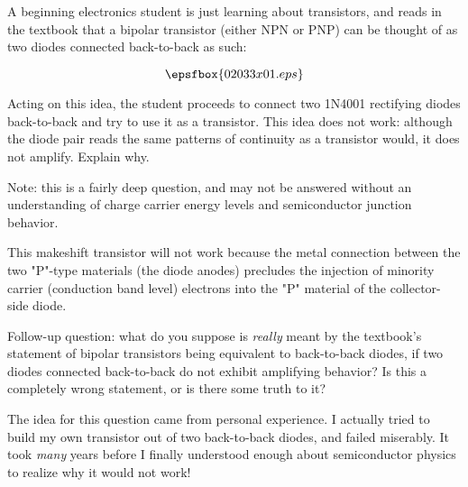 

A beginning electronics student is just learning about transistors, and reads in the textbook that a bipolar transistor (either NPN or PNP) can be thought of as two diodes connected back-to-back as such:

$$\epsfbox{02033x01.eps}$$

Acting on this idea, the student proceeds to connect two 1N4001 rectifying diodes back-to-back and try to use it as a transistor.  This idea does not work: although the diode pair reads the same patterns of continuity as a transistor would, it does not amplify.  Explain why.

Note: this is a fairly deep question, and may not be answered without an understanding of charge carrier energy levels and semiconductor junction behavior.







This makeshift transistor will not work because the metal connection between the two "P"-type materials (the diode anodes) precludes the injection of minority carrier (conduction band level) electrons into the "P" material of the collector-side diode.

\vskip 10pt

Follow-up question: what do you suppose is {\it really} meant by the textbook's statement of bipolar transistors being equivalent to back-to-back diodes, if two diodes connected back-to-back do not exhibit amplifying behavior?  Is this a completely wrong statement, or is there some truth to it?







The idea for this question came from personal experience.  I actually tried to build my own transistor out of two back-to-back diodes, and failed miserably.  It took {\it many} years before I finally understood enough about semiconductor physics to realize why it would not work!




